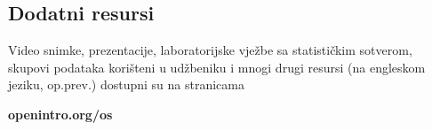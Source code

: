 %
%
%
%


\subsection*{{\color{oiB}Dodatni resursi}}


Video snimke, prezentacije, laboratorijske vježbe sa statističkim sotverom,
skupovi podataka korišteni u udžbeniku i
mnogi drugi resursi (na engleskom jeziku, op.prev.) dostupni su na stranicama\\[-5mm]
\begin{center}
	{\color{black}\textbf{openintro.org/os}}
\end{center}

